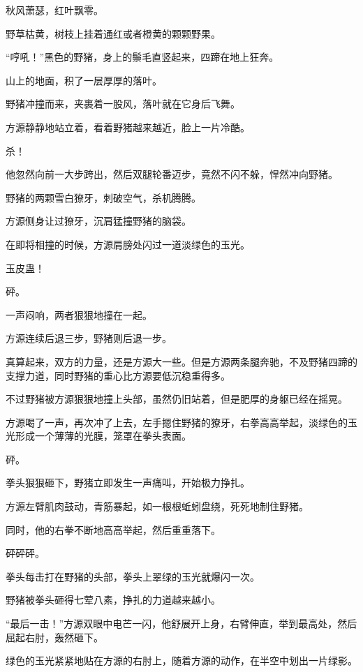 
\begin{this_body}



秋风萧瑟，红叶飘零。

野草枯黄，树枝上挂着通红或者橙黄的颗颗野果。

“哼吼！”黑色的野猪，身上的鬃毛直竖起来，四蹄在地上狂奔。

山上的地面，积了一层厚厚的落叶。

野猪冲撞而来，夹裹着一股风，落叶就在它身后飞舞。

方源静静地站立着，看着野猪越来越近，脸上一片冷酷。

杀！

他忽然向前一大步跨出，然后双腿轮番迈步，竟然不闪不躲，悍然冲向野猪。

野猪的两颗雪白獠牙，刺破空气，杀机腾腾。

方源侧身让过獠牙，沉肩猛撞野猪的脑袋。

在即将相撞的时候，方源肩膀处闪过一道淡绿色的玉光。

玉皮蛊！

砰。

一声闷响，两者狠狠地撞在一起。

方源连续后退三步，野猪则后退一步。

真算起来，双方的力量，还是方源大一些。但是方源两条腿奔驰，不及野猪四蹄的支撑力道，同时野猪的重心比方源要低沉稳重得多。

不过野猪被方源狠狠地撞上头部，虽然仍旧站着，但是肥厚的身躯已经在摇晃。

方源喝了一声，再次冲了上去，左手摁住野猪的獠牙，右拳高高举起，淡绿色的玉光形成一个薄薄的光膜，笼罩在拳头表面。

砰。

拳头狠狠砸下，野猪立即发生一声痛叫，开始极力挣扎。

方源左臂肌肉鼓动，青筋暴起，如一根根蚯蚓盘绕，死死地制住野猪。

同时，他的右拳不断地高高举起，然后重重落下。

砰砰砰。

拳头每击打在野猪的头部，拳头上翠绿的玉光就爆闪一次。

野猪被拳头砸得七荤八素，挣扎的力道越来越小。

“最后一击！”方源双眼中电芒一闪，他舒展开上身，右臂伸直，举到最高处，然后屈起右肘，轰然砸下。

绿色的玉光紧紧地贴在方源的右肘上，随着方源的动作，在半空中划出一片绿影。


\end{this_body}
